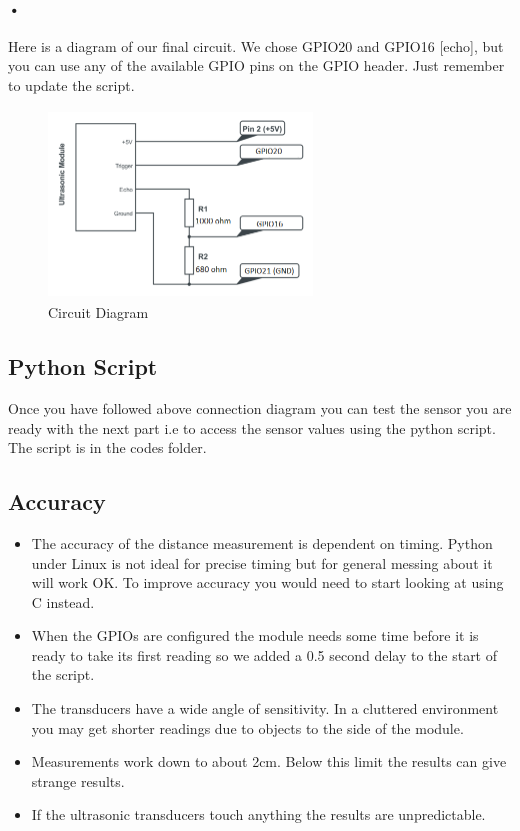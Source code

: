 \documentclass[11pt,a4paper]{article}
\begin{document}
\paragraph{•}
Here is a diagram of our final circuit. We chose GPIO20 and GPIO16 [echo], but you can use any of the available GPIO pins on the GPIO header. Just remember to update the script.
	\begin{figure}[h]
	 	\centering
		\includegraphics[width=7cm,height=5cm]{pin}
		\caption{Circuit Diagram}
	\end{figure}
	\subsection{Python Script}
		Once you have followed above connection diagram you can test the sensor you are ready with the next part i.e to access the sensor values using the python script. The script is in the codes folder.
	\subsection{Accuracy}
		\begin{itemize}
			\item The accuracy of the distance measurement is dependent on timing. Python under Linux is not ideal for precise timing but for general messing about it will work OK. To improve accuracy you would need to start looking at using C instead.
			\item When the GPIOs are configured the module needs some time before it is ready to take its first reading so we added a 0.5 second delay to the start of the script.
			\item The transducers have a wide angle of sensitivity. In a cluttered environment you may get shorter readings due to objects to the side of the module.
			\item Measurements work down to about 2cm. Below this limit the results can give strange results.
			\item If the ultrasonic transducers touch anything the results are unpredictable.
		\end{itemize}
\end{document}
